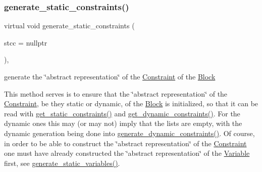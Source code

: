 \subsubsection{\texorpdfstring{generate\+\_\+static\+\_\+constraints()}{generate\_static\_constraints()}}
{\footnotesize\ttfamily virtual void generate\+\_\+static\+\_\+constraints (\begin{DoxyParamCaption}\item[{\mbox{\hyperlink{class_s_m_spp__di__unipi__it_1_1_configuration}{Configuration}} $\ast$}]{stcc = {\ttfamily nullptr} }\end{DoxyParamCaption})\hspace{0.3cm}{\ttfamily [inline]}, {\ttfamily [virtual]}}



generate the \char`\"{}abstract representation\char`\"{} of the \mbox{\hyperlink{class_s_m_spp__di__unipi__it_1_1_constraint}{Constraint}} of the \mbox{\hyperlink{class_s_m_spp__di__unipi__it_1_1_block}{Block}} 

This method serves is to ensure that the \char`\"{}abstract representation\char`\"{} of the \mbox{\hyperlink{class_s_m_spp__di__unipi__it_1_1_constraint}{Constraint}}, be they static or dynamic, of the \mbox{\hyperlink{class_s_m_spp__di__unipi__it_1_1_block}{Block}} is initialized, so that it can be read with \mbox{\hyperlink{class_s_m_spp__di__unipi__it_1_1_block_afaf2dca465cd70d9d76bcfe839e52aec}{get\+\_\+static\+\_\+constraints()}} and \mbox{\hyperlink{class_s_m_spp__di__unipi__it_1_1_block_a3f409f4fea9571956a95359dbeef7395}{get\+\_\+dynamic\+\_\+constraints()}}. For the dynamic ones this may (or may not) imply that the lists are empty, with the dynamic generation being done into \mbox{\hyperlink{class_s_m_spp__di__unipi__it_1_1_block_a306892932ce912f30548f3f3e4072e9b}{generate\+\_\+dynamic\+\_\+constraints()}}. Of course, in order to be able to construct the \char`\"{}abstract representation\char`\"{} of the \mbox{\hyperlink{class_s_m_spp__di__unipi__it_1_1_constraint}{Constraint}} one must have already constructed the \char`\"{}abstract representation\char`\"{} of the \mbox{\hyperlink{class_s_m_spp__di__unipi__it_1_1_variable}{Variable}} first, see \mbox{\hyperlink{class_s_m_spp__di__unipi__it_1_1_block_acd79fd0980af547f2f06241cb989094e}{generate\+\_\+static\+\_\+variables()}}.

